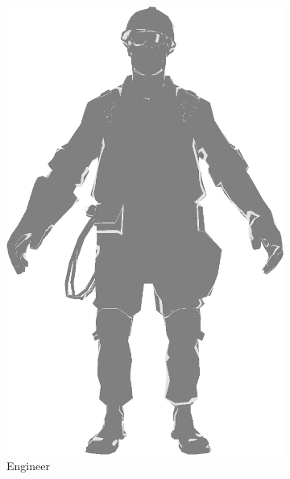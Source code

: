 \begin{figure}[h]
    \centering
    \begin{subfigure}[b]{0.25\textwidth}
    \includegraphics[width=\textwidth]{img/Lighting/Rim.png}
    \caption{Engineer}
    \label{fig:Rim}
    \end{subfigure}
    \centering
    \begin{subfigure}[b]{0.25\textwidth}

\end{subfigure}
\end{figure}
